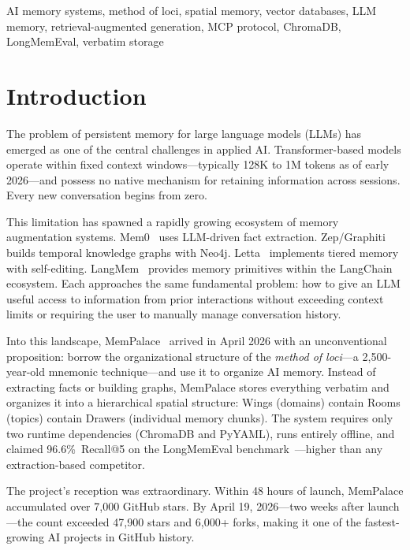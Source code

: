 \documentclass[twoside,11pt]{article}
\begin{document}
\begin{keywords}
  AI memory systems, method of loci, spatial memory, vector databases,
  LLM memory, retrieval-augmented generation, MCP protocol, ChromaDB,
  LongMemEval, verbatim storage
\end{keywords}

\section{Introduction}
\label{sec:intro}

The problem of persistent memory for large language models (LLMs) has emerged
as one of the central challenges in applied AI\@.  Transformer-based models
operate within fixed context windows---typically 128K to 1M tokens as of early
2026---and possess no native mechanism for retaining information across
sessions.  Every new conversation begins from zero.

This limitation has spawned a rapidly growing ecosystem of memory augmentation
systems.  Mem0~\citep{mem0} uses LLM-driven fact extraction.
Zep/Graphiti~\citep{zep} builds temporal knowledge graphs with Neo4j.
Letta~\citep{letta} implements tiered memory with self-editing.
LangMem~\citep{langmem} provides memory primitives within the LangChain
ecosystem.  Each approaches the same fundamental problem: how to give an LLM
useful access to information from prior interactions without exceeding context
limits or requiring the user to manually manage conversation history.

Into this landscape, MemPalace~\citep{mempalace} arrived in April 2026 with
an unconventional proposition: borrow the organizational structure of the
\emph{method of loci}---a 2{,}500-year-old mnemonic technique---and use it to
organize AI memory.  Instead of extracting facts or building graphs, MemPalace
stores everything verbatim and organizes it into a hierarchical spatial
structure: Wings (domains) contain Rooms (topics) contain Drawers (individual
memory chunks).  The system requires only two runtime dependencies (ChromaDB
and PyYAML), runs entirely offline, and claimed 96.6\%\ Recall@5 on the
LongMemEval benchmark~\citep{longmemeval}---higher than any extraction-based
competitor.

The project's reception was extraordinary.  Within 48 hours of launch,
MemPalace accumulated over 7{,}000 GitHub stars.  By April 19, 2026---two
weeks after launch---the count exceeded 47{,}900 stars and 6{,}000+ forks,
making it one of the fastest-growing AI projects in GitHub history.
\end{document}
